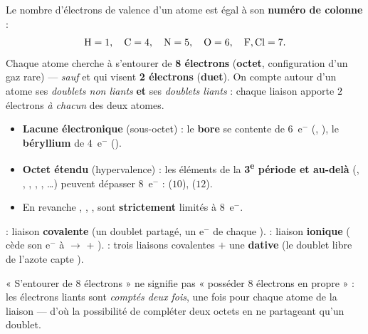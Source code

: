 \documentclass[11pt,a4paper]{article}
\begin{document}
\begin{cle}
Le nombre d'électrons de valence d'un atome est égal à son \textbf{numéro de colonne} :
\[ \ce{H}=1,\quad \ce{C}=4,\quad \ce{N}=5,\quad \ce{O}=6,\quad \ce{F},\ce{Cl}=7. \]
Chaque atome cherche à s'entourer de \textbf{8 électrons} (\textbf{octet}, configuration d'un gaz
rare) — \emph{sauf}  et  qui visent \textbf{2 électrons} (\textbf{duet}). On compte
autour d'un atome ses \emph{doublets non liants} \textbf{et} ses \emph{doublets liants} : chaque
liaison apporte $2$ électrons \emph{à chacun} des deux atomes.
\end{cle}

\begin{piege}
\begin{itemize}[leftmargin=1.5em,topsep=2pt,itemsep=2pt]
  \item \textbf{Lacune électronique} (sous-octet) : le \textbf{bore} se contente de $6$~e$^-$
        (, ), le \textbf{béryllium} de $4$~e$^-$ ().
  \item \textbf{Octet étendu} (hypervalence) : les éléments de la \textbf{3\textsuperscript{e}
        période et au-delà} (, , , , , \ldots) peuvent
        dépasser $8$~e$^-$ :  ($10$),  ($12$).
  \item En revanche , , ,  sont \textbf{strictement} limités à $8$~e$^-$.
\end{itemize}
\end{piege}

\begin{exemplebox}
 : liaison \textbf{covalente} (un doublet partagé, un e$^-$ de chaque ). \quad
{} : liaison \textbf{ionique} ( cède son e$^-$ à  $\to$  + ).
\quad {} : trois liaisons  covalentes $+$ une \textbf{dative} (le doublet libre de
l'azote capte ).
\end{exemplebox}

\begin{remarque}
« S'entourer de $8$ électrons » ne signifie pas « posséder $8$ électrons en propre » : les
électrons liants sont \emph{comptés deux fois}, une fois pour chaque atome de la liaison — d'où
la possibilité de compléter deux octets en ne partageant qu'un doublet.
\end{remarque}
\end{document}
